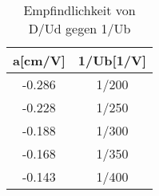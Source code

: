 \begin{table}
\begin{center}
\begin{tabular}{c|c}
a[cm/V] & 1/Ub[1/V] \\
\hline
-0.286 & 1/200 \\
-0.228 & 1/250 \\
-0.188 & 1/300 \\
-0.168 & 1/350 \\
-0.143 & 1/400 \\
\end{tabular}
\caption[]{Empfindlichkeit von D/Ud gegen 1/Ub}
\label{tabelle_5}
\end{center}
\end{table}